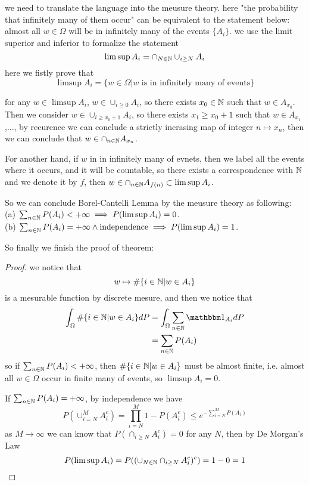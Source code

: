 \documentclass[en,geye,blue,normal,12pt,bibend=bibtex]{elegantnote}
\begin{document}
we need to translate the language into the meusure theory. here "the probability that infinitely many of them occur" can be equivalent to the statement below: almost all \(w \in \Omega\) will be in infinitely many of the events \(\{A_i\}\). we use the limit superior and inferior to formalize the statement
\[\limsup A_i  = \cap_{N \in \mathbb{N}}\cup_{i \geq N}A_i\]
here we fistly prove that
\[\limsup A_i = \{w \in \Omega | w \text{ is  in infinitely many of events}\}\]

for any \(w \in \limsup A_i\), \(w \in \cup_{i \geq 0}A_i\), so there exists \(x_0 \in \mathbb{N}\) such that \(w \in A_{x_0}\). Then we consider \(w \in \cup_{i \geq x_0 +1 } A_i\), so there exists \(x_1 \geq x_0+1\) such that \(w \in A_{x_1}\),..., by recurence we can conclude a strictly incrasing map of integer \(n \mapsto x_n\), then we can conclude that \(w \in \cap_{n \in \mathbb{N}}A_{x_n}\).

For another hand, if \(w\) in in infinitely many of evnets, then we label all the events where it occurs, and it will be countable, so there exists a correspondence with \(\mathbb{N}\) and we denote it by \(f\), then \(w \in \cap_{n \in \mathbb{N}}A_{f(n)} \subset \limsup A_i\).

So we can conclude Borel-Cantelli Lemma by the meusure theory as following:
\\(a) \(\sum_{n \in \mathbb{N}} P(A_i) < +\infty  \implies P(\limsup A_i) = 0\).
\\(b) \(\sum_{n \in \mathbb{N}} P(A_i) = +\infty \land  \text{independence} \implies P(\limsup A_i) = 1 \).

So finally we finish the proof of theorem:
\begin{proof}
    we notice that 
    \[w \mapsto \# \{i \in \mathbb{N}| w \in A_i\}\]
    is a mesurable function by discrete mesure, and then we notice that 
    \begin{align*}
        \int_{\Omega}\# \{i \in \n| w \in A_i\} dP &= \int_{\Omega} \sum_{\ninn} \cha_{A_i}dP \\
        & = \sum_{\ninn}P(A_i)
    \end{align*}
    so if \(\sum_{n \in \mathbb{N}} P(A_i) < +\infty\), then \(\# \{i \in \mathbb{N}| w \in A_i\}\) must be almost finite, i.e. almost all \(w \in \Omega\) occur in finite many of events, so \(\limsup A_i = 0\).

    If \(\sum_{n \in \mathbb{N}} P(A_i) = +\infty\), by independence we have 
    \[P({\cup_{i=N}^M A_i^c }) = \prod_{i=N}^M 1-P(A_i^c) \leq e^{-\sum_{i=N}^M P(A_i)}\]
    as \(M \rightarrow \infty\) we can know that \(P(\cap_{i \geq N}A_i^c) = 0\) for any \(N\), then by De Morgan's Law
    \[P(\limsup A_i) = P((\cup_{N \in \mathbb{N}}\cap_{i\geq N}A_i^c)^c) = 1 - 0 = 1\] 
\end{proof}
\end{document}
